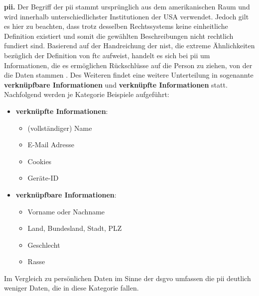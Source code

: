 
\noindent \textbf{\acf{pii}.}
Der Begriff der \ac{pii} stammt ursprünglich aus dem amerikanischen Raum und wird innerhalb unterschiedlichster Institutionen der USA verwendet. Jedoch gilt es hier zu beachten, dass trotz desselben Rechtssystems keine einheitliche Definition existiert und somit die gewählten Beschreibungen nicht rechtlich fundiert sind. Basierend auf der Handreichung der \ac{nist}, die extreme Ähnlichkeiten bezüglich der Definition von \ac{ftc} aufweist, handelt es sich bei \acs{pii} um Informationen, die es ermöglichen Rückschlüsse auf die Person zu ziehen, von der die Daten stammen \cite{PiwikPro2022,NIST2010}. Des Weiteren findet eine weitere Unterteilung in sogenannte \textbf{verknüpfbare Informationen} und \textbf{verknüpfte Informationen} statt. Nachfolgend werden je Kategorie Beispiele aufgeführt:

\begin{itemize}
	\item \textbf{verknüpfte Informationen}:
		\begin{itemize}
			\item (vollständiger) Name
			\item E-Mail Adresse
			\item Cookies
			\item Geräte-ID
		\end{itemize}
	\item \textbf{verknüpfbare Informationen}:
		\begin{itemize}
			\item Vorname oder Nachname
			\item Land, Bundesland, Stadt, PLZ
			\item Geschlecht
			\item Rasse
		\end{itemize}
\end{itemize}

\noindent Im Vergleich zu persönlichen Daten im Sinne der \ac{dsgvo} umfassen die \acs{pii} deutlich weniger Daten, die in diese Kategorie fallen.

